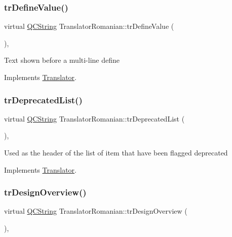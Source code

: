 \subsubsection{\texorpdfstring{trDefineValue()}{trDefineValue()}}
{\footnotesize\ttfamily virtual \mbox{\hyperlink{class_q_c_string}{Q\+C\+String}} Translator\+Romanian\+::tr\+Define\+Value (\begin{DoxyParamCaption}{ }\end{DoxyParamCaption})\hspace{0.3cm}{\ttfamily [inline]}, {\ttfamily [virtual]}}

Text shown before a multi-\/line define 

Implements \mbox{\hyperlink{class_translator}{Translator}}.

\mbox{\label{class_translator_romanian_af7975a364af808de32a930ff04c0c06b}} 
\subsubsection{\texorpdfstring{trDeprecatedList()}{trDeprecatedList()}}
{\footnotesize\ttfamily virtual \mbox{\hyperlink{class_q_c_string}{Q\+C\+String}} Translator\+Romanian\+::tr\+Deprecated\+List (\begin{DoxyParamCaption}{ }\end{DoxyParamCaption})\hspace{0.3cm}{\ttfamily [inline]}, {\ttfamily [virtual]}}

Used as the header of the list of item that have been flagged deprecated 

Implements \mbox{\hyperlink{class_translator}{Translator}}.

\mbox{\label{class_translator_romanian_aa633056506758f5d3a5d36262e7b7f94}} 
\subsubsection{\texorpdfstring{trDesignOverview()}{trDesignOverview()}}
{\footnotesize\ttfamily virtual \mbox{\hyperlink{class_q_c_string}{Q\+C\+String}} Translator\+Romanian\+::tr\+Design\+Overview (\begin{DoxyParamCaption}{ }\end{DoxyParamCaption})\hspace{0.3cm}{\ttfamily [inline]}, {\ttfamily [virtual]}}

